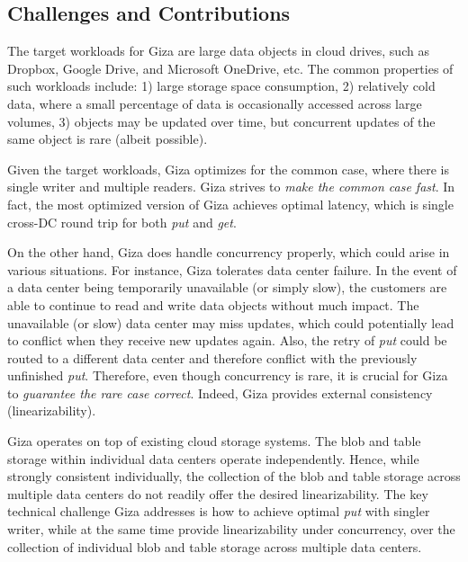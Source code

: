 \subsection{Challenges and Contributions}

The target workloads for Giza are large data objects in cloud drives, such as
Dropbox, Google Drive, and Microsoft OneDrive, etc. The common properties of
such workloads include: 1) large storage space consumption, 2) relatively cold
data, where a small percentage of data is occasionally accessed across large
volumes, 3) objects may be updated over time, but concurrent updates of the same
object is rare (albeit possible).

Given the target workloads, Giza optimizes for the common case, where there is
single writer and multiple readers. Giza strives to {\em make the common case
  fast}. In fact, the most optimized version of Giza achieves optimal latency,
which is single cross-DC round trip for both {\em put} and {\em get}.

On the other hand, Giza does handle concurrency properly, which could arise in
various situations. For instance, Giza tolerates data center failure. In the
event of a data center being temporarily unavailable (or simply slow), the
customers are able to continue to read and write data objects without much
impact. The unavailable (or slow) data center may miss updates, which could
potentially lead to conflict when they receive new updates again. Also, the
retry of {\em put} could be routed to a different data center and therefore
conflict with the previously unfinished {\em put}. Therefore, even though
concurrency is rare, it is crucial for Giza to {\em guarantee the rare case
  correct}. Indeed, Giza provides external consistency (linearizability).

Giza operates on top of existing cloud storage systems. 
The blob and table storage within individual data centers operate independently.
Hence, while strongly consistent individually, the collection of the blob and
table storage across multiple data centers do not readily offer the desired
linearizability. The key technical challenge Giza addresses is how to achieve
optimal {\em put} with singler writer, while at the same time provide
linearizability under concurrency, over the collection of individual blob and
table storage across multiple data centers.

